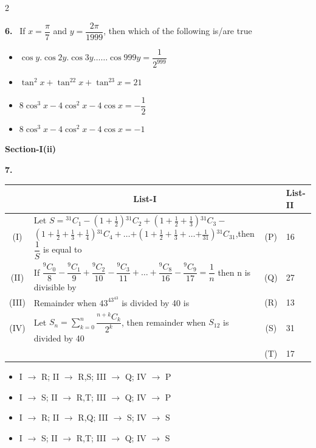 \documentclass[10pt]{extarticle}
\newcommand{\sect}[1]{\par\smallskip\noindent\textbf{#1}\par}
\newcommand{\qn}[1]{\par\smallskip\noindent\textbf{#1.}~}
\newenvironment{qoptions}{\begin{itemize}[leftmargin=1.8em,itemsep=1pt,topsep=2pt,label={}]}{\end{itemize}}
\newcommand{\opt}[2]{\item[(#1)] #2}
\begin{document}
\begin{multicols}{2}
\qn{6} If $x=\dfrac\pi7$ and $y=\dfrac{2\pi}{1999}$, then which of the following is/are true
\begin{qoptions}
\opt{A}{$\cos y.\cos2y.\cos3y\dots\dots\cos999y=\dfrac1{2^{999}}$}
\opt{B}{$\tan^2x+\tan^22x+\tan^23x=21$}
\opt{C}{$8\cos^3x-4\cos^2x-4\cos x=-\dfrac12$}
\opt{D}{$8\cos^3x-4\cos^2x-4\cos x=-1$}
\end{qoptions}

\sect{Section-I(ii)}

\qn{7}\par\nobreak
\begin{center}\small\setlength{\tabcolsep}{3pt}
\begin{tabular}{|c|p{4.1cm}|c|p{1.0cm}|}
\hline
 & \multicolumn{1}{c|}{\textbf{List-I}} & & \textbf{\footnotesize List-II} \\
\hline
(I) & Let $S={}^{31}C_1-\left(1+\tfrac12\right){}^{31}C_2+$\newline $\left(1+\tfrac12+\tfrac13\right){}^{31}C_3-$\newline $\left(1+\tfrac12+\tfrac13+\tfrac14\right){}^{31}C_4+\dots$\newline $+\left(1+\tfrac12+\tfrac13+\dots\right.$\newline $\left.+\tfrac1{31}\right){}^{31}C_{31}$,\newline then $\dfrac1S$ is equal to & (P) & 16 \\
\hline
(II) & If $\dfrac{{}^9C_0}8-\dfrac{{}^9C_1}9+\dfrac{{}^9C_2}{10}-\dfrac{{}^9C_3}{11}+\dots+\dfrac{{}^9C_8}{16}-\dfrac{{}^9C_9}{17}=\dfrac1n$ then n is divisible by & (Q) & 27 \\
\hline
(III) & Remainder when $43^{43^{43}}$ is divided by 40 is & (R) & 13 \\
\hline
(IV) & Let $S_n=\displaystyle\sum_{k=0}^{n}\dfrac{{}^{n+k}C_k}{2^k}$, then remainder when $S_{12}$ is divided by 40 & (S) & 31 \\
\hline
 & & (T) & 17 \\
\hline
\end{tabular}
\end{center}
\begin{qoptions}
\opt{A}{I $\to$ R; II $\to$ R,S; III $\to$ Q; IV $\to$ P}
\opt{B}{I $\to$ S; II $\to$ R,T; III $\to$ Q; IV $\to$ P}
\opt{C}{I $\to$ R; II $\to$ R,Q; III $\to$ S; IV $\to$ S}
\opt{D}{I $\to$ S; II $\to$ R,T; III $\to$ Q; IV $\to$ S}
\end{qoptions}


\end{multicols}
\end{document}
